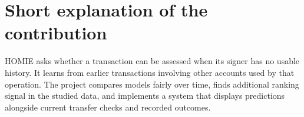 \documentclass[12pt,a4paper,oneside]{report}
\begin{document}
\section{Short explanation of the contribution}
HOMIE asks whether a transaction can be assessed when its signer has no usable history. It learns from earlier transactions involving other accounts used by that operation. The project compares models fairly over time, finds additional ranking signal in the studied data, and implements a system that displays predictions alongside current transfer checks and recorded outcomes.
\end{document}
